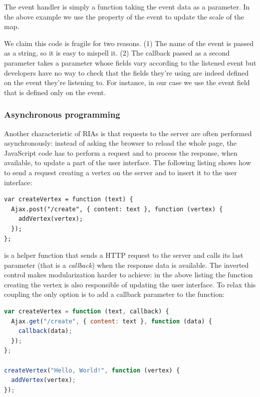 \documentclass[american,english,runningheads]{llncs}
\begin{document}
The event handler is simply a function taking the event data as a parameter. In the above example we use the
 property of the event to update the scale of the map.

We claim this code is fragile for two reasons. (1) The name of the event is passed as a string, so it is easy to
mispell it. (2) The callback passed as a second parameter takes a parameter  whose fields vary according to
the listened event but developers have no way to check that the fields they’re using are indeed defined on the event
they’re listening to. For instance, in our case we use the  event field that is defined only on the
 event.

\subsubsection{Asynchronous programming}

Another characteristic of RIAs is that requests to the server are often performed asynchronously: instead of asking
the browser to reload the whole page, the JavaScript code has to perform a request and to process the response, when
available, to update a part of the user interface. The following listing shows how to send a request creating a
vertex on the server and to insert it to the user interface:

\begin{lstlisting}
var createVertex = function (text) {
  Ajax.post("/create", { content: text }, function (vertex) {
    addVertex(vertex);
  });
};
\end{lstlisting}

 is a helper function that sends a HTTP request to the server and calls its last parameter
(that is a \emph{callback}) when the response data is available. The inverted control makes modularization harder to
achieve: in the above listing the function creating the vertex is also responsible of updating the user interface.
To relax this coupling the only option is to add a callback parameter to the  function:

\begin{lstlisting}[language=JavaScript,label=async-js,caption=Callback-driven JavaScript APIs]
var createVertex = function (text, callback) {
  Ajax.get("/create", { content: text }, function (data) {
    callback(data);
  });
};

createVertex("Hello, World!", function (vertex) {
  addVertex(vertex);
});
\end{lstlisting}
\end{document}
